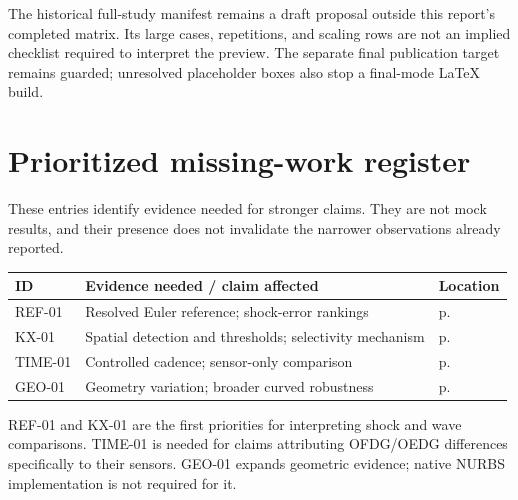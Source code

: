The historical full-study manifest remains a draft proposal outside this
report's completed matrix. Its large cases, repetitions, and scaling rows are
not an implied checklist required to interpret the preview. The separate final
publication target remains guarded; unresolved placeholder boxes also stop a
final-mode LaTeX build.

\section{Prioritized missing-work register}
\label{app:missing-work}
These entries identify evidence needed for stronger claims. They are not mock
results, and their presence does not invalidate the narrower observations
already reported.
\begin{center}\small
\begin{tabular}{@{}p{}p{}p{}@{}}\toprule
ID & Evidence needed / claim affected & Location\\\midrule
REF-01 & Resolved Euler reference; shock-error rankings & p.~\pageref{missing:REF-01}\\
KX-01 & Spatial detection and thresholds; selectivity mechanism & p.~\pageref{missing:KX-01}\\
TIME-01 & Controlled cadence; sensor-only comparison & p.~\pageref{missing:TIME-01}\\
GEO-01 & Geometry variation; broader curved robustness & p.~\pageref{missing:GEO-01}\\\bottomrule
\end{tabular}\end{center}
REF-01 and KX-01 are the first priorities for interpreting shock and wave
comparisons. TIME-01 is needed for claims attributing OFDG/OEDG differences
specifically to their sensors. GEO-01 expands geometric evidence; native
NURBS implementation is not required for it.
